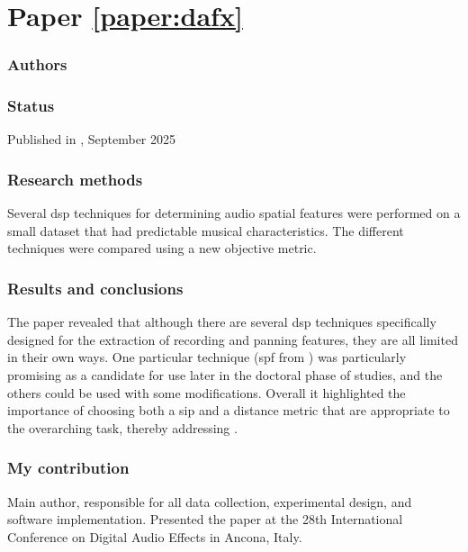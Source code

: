 \section*{Paper \ref{paper:dafx}}

\textbf{}

\subsubsection*{Authors}

\subsubsection*{Status}
Published in , September 2025

\subsubsection*{Research methods}
Several \gls{dsp} techniques for determining audio spatial features were performed on a small dataset that had predictable musical characteristics. The different techniques were compared using a new objective metric.

\subsubsection*{Results and conclusions}
The paper revealed that although there are several \gls{dsp} techniques specifically designed for the extraction of recording and panning features, they are all limited in their own ways. One particular technique (\gls{spf} from \cite{tzanetakisStereoPanningFeatures2007}) was particularly promising as a candidate for use later in the doctoral phase of studies, and the others could be used with some modifications. Overall it highlighted the importance of choosing both a \gls{sip} and a distance metric that are appropriate to the overarching task, thereby addressing \rqb{}.

\subsubsection*{My contribution}
Main author, responsible for all data collection, experimental design, and software implementation. Presented the paper at the 28th International Conference on Digital Audio Effects in Ancona, Italy.